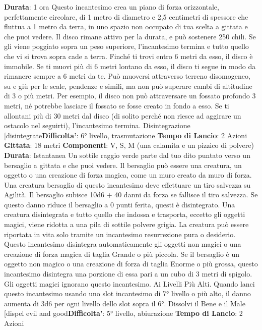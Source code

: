 \begin{multicols}{2}
\textbf{Durata}: 1 ora
Questo incantesimo crea un piano di forza orizzontale,
perfettamente circolare, di 1 metro di diametro e 2,5
centimetri di spessore che fluttua a 1 metro da terra, in
uno spazio non occupato di tua scelta a gittata e che
puoi vedere. Il disco rimane attivo per la durata, e può
sostenere 250 chili. Se gli viene poggiato sopra un peso
superiore, l’incantesimo termina e tutto quello che vi si
trova sopra cade a terra.
Finché ti trovi entro 6 metri da esso, il disco è immobile.
Se ti muovi più di 6 metri lontano da esso, il disco ti
segue in modo da rimanere sempre a 6 metri da te. Può
muoversi attraverso terreno disomogeneo, su e giù per
le scale, pendenze e simili, ma non può superare cambi
di altitudine di 3 o più metri. Per esempio, il disco non
può attraversare un fossato profondo 3 metri, né
potrebbe lasciare il fossato se fosse creato in fondo a
esso.
Se ti allontani più di 30 metri dal disco (di solito perché
non riesce ad aggirare un ostacolo nel seguirti),
l’incantesimo termina.
Disintegrazione
[disintegrate\textbf{Difficolta'}:
6° livello, trasmutazione
\textbf{Tempo di Lancio}: 2 Azioni
\textbf{Gittata}: 18 metri
\textbf{Componenti}: V, S, M (una calamita e un pizzico di
polvere)
\textbf{Durata}: Istantanea
Un sottile raggio verde parte dal tuo dito puntato verso
un bersaglio a gittata e che puoi vedere. Il bersaglio
può essere una creatura, un oggetto o una creazione di
forza magica, come un muro creato da muro di forza.
Una creatura bersaglio di questo incantesimo deve
effettuare un tiro salvezza su Agilità. Il bersaglio
subisce 10d6 + 40 danni da forza se fallisce il tiro
salvezza. Se questo danno riduce il bersaglio a 0 punti
ferita, questi è disintegrato.
Una creatura disintegrata e tutto quello che indossa e
trasporta, eccetto gli oggetti magici, viene ridotta a una
pila di sottile polvere grigia. La creatura può essere
riportata in vita solo tramite un incantesimo
resurrezione pura o desiderio.
Questo incantesimo disintegra automaticamente gli
oggetti non magici o una creazione di forza magica di
taglia Grande o più piccola. Se il bersaglio è un oggetto
non magico o una creazione di forza di taglia Enorme o
più grossa, questo incantesimo disintegra una porzione
di essa pari a un cubo di 3 metri di spigolo. Gli oggetti
magici ignorano questo incantesimo.
Ai Livelli Più Alti. Quando lanci questo incantesimo
usando uno slot incantesimo di 7° livello o più alto, il
danno aumenta di 3d6 per ogni livello dello slot sopra il
6°.
Dissolvi il Bene e il Male
[dispel evil and good\textbf{Difficolta'}:
5° livello, abiurazione
\textbf{Tempo di Lancio}: 2 Azioni

\end{multicols}
